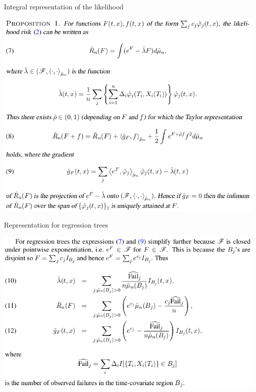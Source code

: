 \documentclass{beamer}\usepackage{listings}
\begin{document}
\begin{frame}[label={sec:org46f5801}]{Integral representation of the likelihood}
\begin{center}
\includegraphics[width=.9\linewidth]{./screenshots/Screenshot_proposition1.png}
\end{center}
\end{frame}

\begin{frame}[label={sec:org065597a}]{Representation for regression trees}
\begin{center}
\includegraphics[width=.9\linewidth]{./screenshots/Screenshot_prop1-trees.png}
\end{center}
\end{frame}
\end{document}
